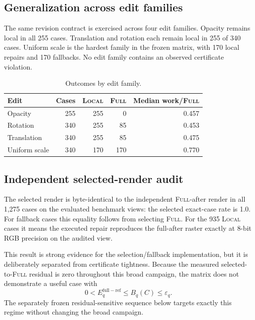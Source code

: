 \documentclass[acmtog,nonacm]{acmart}
\newcommand{\FULL}{\textsc{Full}}
\newcommand{\LOCAL}{\textsc{Local}}
\begin{document}
\subsection{Generalization across edit families}
The same revision contract is exercised across four edit families. Opacity remains local in all 255 cases. Translation and rotation each remain local in 255 of 340 cases. Uniform scale is the hardest family in the frozen matrix, with 170 local repairs and 170 fallbacks. No edit family contains an observed certificate violation.

\begin{table}[t]
\caption{Outcomes by edit family.}
\label{tab:edits}
\centering
\footnotesize
{}
\begin{tabularx}{\columnwidth}{@{}Yrrrr@{}}
\toprule
Edit & Cases & \LOCAL{} & \FULL{} & Median work/\FULL{} \\
\midrule
Opacity & 255 & 255 & 0 & 0.457 \\
Rotation & 340 & 255 & 85 & 0.453 \\
Translation & 340 & 255 & 85 & 0.475 \\
Uniform scale & 340 & 170 & 170 & 0.770 \\
\bottomrule
\end{tabularx}
\end{table}

\subsection{Independent selected-render audit}
The selected render is byte-identical to the independent \FULL{}-after render in all 1,275 cases on the evaluated benchmark views: the selected exact-case rate is 1.0. For fallback cases this equality follows from selecting \FULL{}. For the 935 \LOCAL{} cases it means the executed repair reproduces the full-after raster exactly at 8-bit RGB precision on the audited view.

This result is strong evidence for the selection/fallback implementation, but it is deliberately separated from certificate tightness. Because the measured selected-to-\FULL{} residual is zero throughout this broad campaign, the matrix does not demonstrate a useful case with
\begin{equation}
0 < E_q^{\mathrm{full-ref}} \le B_q(C) \le \varepsilon_q.
\end{equation}
The separately frozen residual-sensitive sequence below targets exactly this regime without changing the broad campaign.
\end{document}
